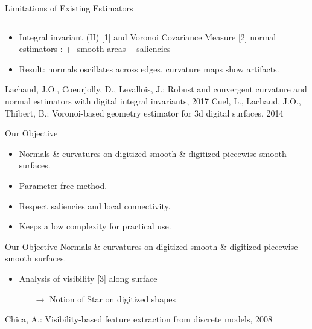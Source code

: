 \documentclass[11pt]{beamer}
\begin{document}
\begin{frame}{Limitations of Existing Estimators}
\begin{columns}
        \end{columns}
        \begin{itemize}
            \item Integral invariant (II) [1] and Voronoi Covariance Measure [2] normal estimators : \textcircled{+} smooth areas \textcircled{-} saliencies
            \item Result: normals oscillates across edges, curvature maps show artifacts.
        \end{itemize}
        \flushleft
        \fontsize{5}{7}\selectfont
        [1] Lachaud, J.O., Coeurjolly, D., Levallois, J.: Robust and convergent curvature and normal estimators with digital integral invariants, 2017
        \newline
        [2] Cuel, L., Lachaud, J.O., Thibert, B.: Voronoi-based geometry estimator for 3d digital surfaces, 2014
    \end{frame}
    \begin{frame}{Our Objective}

        \vspace{0.5em} %

        \begin{itemize}
            \item Normals \& curvatures on digitized smooth \& digitized piecewise-smooth surfaces.
            \item Parameter-free method.
            \item Respect saliencies and local connectivity.
            \item Keeps a low complexity for practical use.
        \end{itemize}
    \end{frame}
    \begin{frame}{Our Objective}
        Normals \& curvatures on digitized smooth \& digitized piecewise-smooth surfaces.
        \begin{itemize}
            \item Analysis of visibility [3] along surface
            \begin{itemize}
                \item[$\rightarrow$] Notion of Star on digitized shapes
            \end{itemize}
        \end{itemize}
        \vspace{0.3cm}
        \flushleft
        \fontsize{5}{7}\selectfont
        [3] Chica, A.: Visibility-based feature extraction from discrete models, 2008
    \end{frame}
\end{document}
